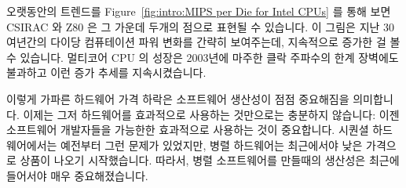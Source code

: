 오랫동안의 트렌드를 Figure~\ref{fig:intro:MIPS per Die for Intel CPUs} 를 통해
보면 CSIRAC 와 Z80 은 그 가운데 두개의 점으로 표현될 수 있습니다.
이 그림은 지난 30여년간의 다이당 컴퓨테이션 파워 변화를 간략히 보여주는데,
지속적으로 증가한 걸 볼 수 있습니다.
멀티코어 CPU 의 성장은 2003년에 마주한 클락 주파수의 한계 장벽에도 불과하고
이런 증가 추세를 지속시켰습니다.

이렇게 가파른 하드웨어 가격 하락은 소프트웨어 생산성이 점점 중요해짐을 의미합니다.
이제는 그저 하드웨어를 효과적으로 사용하는 것만으로는 충분하지 않습니다:
이젠 소프트웨어 개발자들을 가능한한 효과적으로 사용하는 것이 중요합니다.
시퀀셜 하드웨어에서는 예전부터 그런 문제가 있었지만, 병렬 하드웨어는 최근에서야
낮은 가격으로 상품이 나오기 시작했습니다.
따라서, 병렬 소프트웨어를 만들때의 생산성은 최근에 들어서야 매우
중요해졌습니다.

